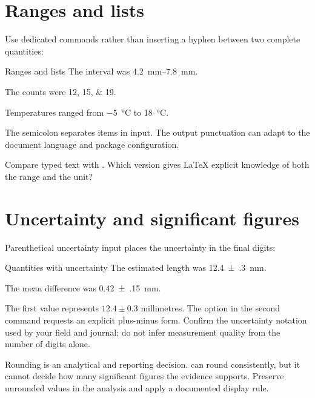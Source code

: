 \section{Ranges and lists}

Use dedicated commands rather than inserting a hyphen between two complete
quantities:

\begin{latexcode}{Ranges and lists}
The interval was \qtyrange{4.2}{7.8}{\milli\metre}.

The counts were \numlist{12;15;19}.

Temperatures ranged from
\qty{-5}{\degreeCelsius} to \qty{18}{\degreeCelsius}.
\end{latexcode}

The semicolon separates items in  input. The output punctuation
can adapt to the document language and package configuration.

\begin{pausepredict}
Compare typed text  with
. Which version gives \LaTeX{} explicit knowledge of both the range and
the unit?
\end{pausepredict}

\section{Uncertainty and significant figures}

Parenthetical uncertainty input places the uncertainty in the final digits:

\begin{latexcode}{Quantities with uncertainty}
The estimated length was \qty{12.4(3)}{\milli\metre}.

The mean difference was
\qty[separate-uncertainty=true]{0.42(15)}{\milli\metre}.
\end{latexcode}

The first value represents \(12.4\pm0.3\) millimetres. The option in the
second command requests an explicit plus-minus form. Confirm the uncertainty
notation used by your field and journal; do not infer measurement quality from
the number of digits alone.

Rounding is an analytical and reporting decision.  can round
consistently, but it cannot decide how many significant figures the evidence
supports. Preserve unrounded values in the analysis and apply a documented
display rule.

